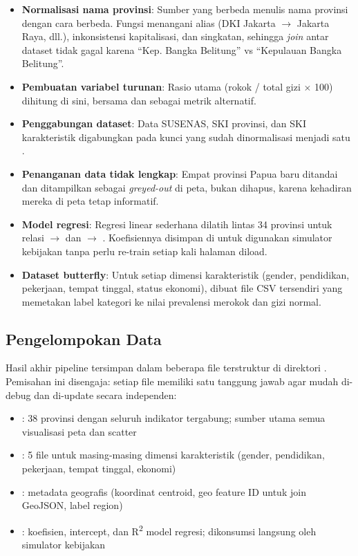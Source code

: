 \begin{itemize}
  \item \textbf{Normalisasi nama provinsi}: Sumber yang berbeda menulis nama provinsi dengan cara berbeda. Fungsi  menangani alias (DKI Jakarta $\to$ Jakarta Raya, dll.), inkonsistensi kapitalisasi, dan singkatan, sehingga \textit{join} antar dataset tidak gagal karena ``Kep. Bangka Belitung'' vs ``Kepulauan Bangka Belitung''.
  \item \textbf{Pembuatan variabel turunan}: Rasio utama  (rokok / total gizi $\times$ 100) dihitung di sini, bersama  dan  sebagai metrik alternatif.
  \item \textbf{Penggabungan dataset}: Data SUSENAS, SKI provinsi, dan SKI karakteristik digabungkan pada kunci  yang sudah dinormalisasi menjadi satu .
  \item \textbf{Penanganan data tidak lengkap}: Empat provinsi Papua baru ditandai  dan ditampilkan sebagai \textit{greyed-out} di peta, bukan dihapus, karena kehadiran mereka di peta tetap informatif.
  \item \textbf{Model regresi}: Regresi linear sederhana dilatih lintas 34 provinsi untuk relasi  $\to$  dan  $\to$ . Koefisiennya disimpan di  untuk digunakan simulator kebijakan tanpa perlu re-train setiap kali halaman diload.
  \item \textbf{Dataset butterfly}: Untuk setiap dimensi karakteristik (gender, pendidikan, pekerjaan, tempat tinggal, status ekonomi), dibuat file CSV tersendiri yang memetakan label kategori ke nilai prevalensi merokok dan gizi normal.
\end{itemize}

\subsection{Pengelompokan Data}

Hasil akhir pipeline tersimpan dalam beberapa file terstruktur di direktori . Pemisahan ini disengaja: setiap file memiliki satu tanggung jawab agar mudah di-debug dan di-update secara independen:

\begin{itemize}
  \item {}: 38 provinsi dengan seluruh indikator tergabung; sumber utama semua visualisasi peta dan scatter
  \item {}: 5 file untuk masing-masing dimensi karakteristik (gender, pendidikan, pekerjaan, tempat tinggal, ekonomi)
  \item {}: metadata geografis (koordinat centroid, geo feature ID untuk join GeoJSON, label region)
  \item {}: koefisien, intercept, dan R\textsuperscript{2} model regresi; dikonsumsi langsung oleh simulator kebijakan
\end{itemize}

